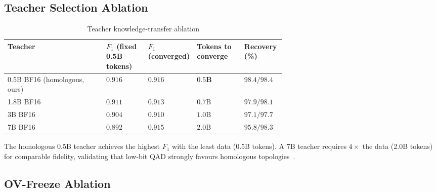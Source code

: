 \documentclass[11pt, a4paper]{article}
\begin{document}
\subsection{Teacher Selection Ablation}

\begin{table}[htbp]
\centering
\caption{Teacher knowledge-transfer ablation}
\label{tab6-en}
\small
\renewcommand{\arraystretch}{1.15}
\begin{tabular}{l>{\centering\arraybackslash}p{0.15\linewidth}>{\centering\arraybackslash}p{0.17\linewidth}>{\centering\arraybackslash}p{0.17\linewidth}>{\centering\arraybackslash}p{0.15\linewidth}}
\toprule
\textbf{Teacher} & \textbf{$F_1$ (fixed 0.5B tokens)} & \textbf{$F_1$ (converged)} & \textbf{Tokens to converge} & \textbf{Recovery (\%)} \\
\midrule
0.5B BF16 (homologous, ours) & $\mathbf{0.916}$ & $\mathbf{0.916}$ & $\mathbf{0.5\text{B}}$ & $\mathbf{98.4} / \mathbf{98.4}$ \\
1.8B BF16 & $0.911$ & $0.913$ & $0.7\text{B}$ & $97.9 / 98.1$ \\
3B BF16 & $0.904$ & $0.910$ & $1.0\text{B}$ & $97.1 / 97.7$ \\
7B BF16 & $0.892$ & $0.915$ & $2.0\text{B}$ & $95.8 / 98.3$ \\
\bottomrule
\end{tabular}
\end{table}

The homologous 0.5B teacher achieves the highest $F_1$ with the least data (0.5B tokens). A 7B teacher requires $4\times$ the data (2.0B tokens) for comparable fidelity, validating that low-bit QAD strongly favours homologous topologies~\cite{3}.

\subsection{OV-Freeze Ablation}
\end{document}
